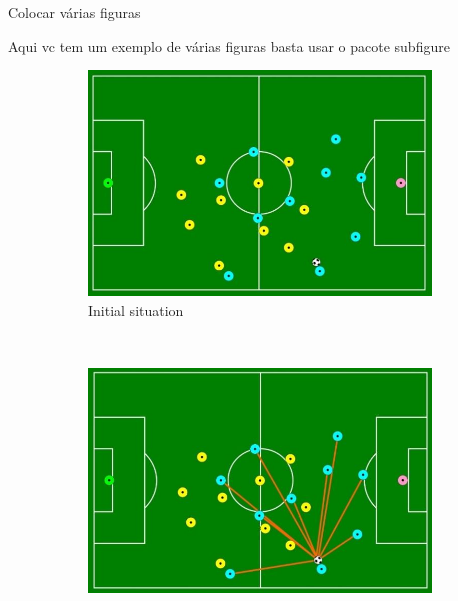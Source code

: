 \documentclass[xcolor=svgnames,8pt]{beamer}
\begin{document}
    \begin{frame}{Colocar várias figuras}
    
        \begin{block}{Aqui vc tem um exemplo de várias figuras}
         basta usar o pacote subfigure
        \end{block}
    
        \begin{figure}
        \centering
        \begin{subfigure}[t]{0.30\textwidth}
            \centering
            \includegraphics[width=1\linewidth]{figuras/pressing_1a.png}
            \caption{Initial situation}
            \label{fig:pressing_a}
        \end{subfigure}%
        ~      
        \begin{subfigure}[t]{0.30\textwidth}
            \centering
            \includegraphics[width=1\linewidth]{figuras/pressing_1b}

\end{subfigure}
\end{figure}
\end{frame}
\end{document}
